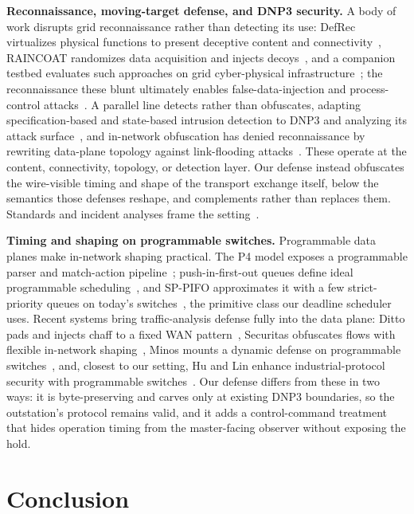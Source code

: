 \noindent\textbf{Reconnaissance, moving-target defense, and DNP3 security.} A body of work disrupts
grid reconnaissance rather than detecting its use: DefRec virtualizes physical functions to present
deceptive content and connectivity~\cite{defrec2020}, RAINCOAT randomizes data acquisition and injects
decoys~\cite{raincoat2019}, and a companion testbed evaluates such approaches on grid cyber-physical
infrastructure~\cite{lintestbed2020}; the reconnaissance these blunt ultimately enables
false-data-injection and process-control attacks~\cite{liufdia2009,cardenas2011,sridhar2012}. A
parallel line detects rather than obfuscates, adapting specification-based and state-based intrusion
detection to DNP3 and analyzing its attack surface~\cite{linbro2013,fovino2010,east2009}, and in-network
obfuscation has denied reconnaissance by rewriting data-plane topology against link-flooding
attacks~\cite{nethide2018}. These operate at the content, connectivity, topology, or detection layer.
Our defense instead obfuscates the wire-visible timing and shape of the transport exchange itself,
below the semantics those defenses reshape, and complements rather than replaces them. Standards and
incident analyses frame the setting~\cite{dnp3std,ukraine2015,nist80082}.

\noindent\textbf{Timing and shaping on programmable switches.} Programmable data planes make in-network
shaping practical. The P4 model exposes a programmable parser and match-action
pipeline~\cite{p4ccr2014}; push-in-first-out queues define ideal programmable
scheduling~\cite{pifo2016}, and SP-PIFO approximates it with a few strict-priority queues on today's
switches~\cite{sppifo2020}, the primitive class our deadline scheduler uses. Recent systems bring
traffic-analysis defense fully into the data plane: Ditto pads and injects chaff to a fixed WAN
pattern~\cite{ditto2022}, Securitas obfuscates flows with flexible in-network
shaping~\cite{securitas2026}, Minos mounts a dynamic defense on programmable switches~\cite{minos2025},
and, closest to our setting, Hu and Lin enhance industrial-protocol security with programmable
switches~\cite{hulin2023}. Our defense differs from these in two ways: it is byte-preserving and carves
only at existing DNP3 boundaries, so the outstation's protocol remains valid, and it adds a
control-command treatment that hides operation timing from the master-facing observer without exposing
the hold.

\section{Conclusion}
\label{sec:concl}

